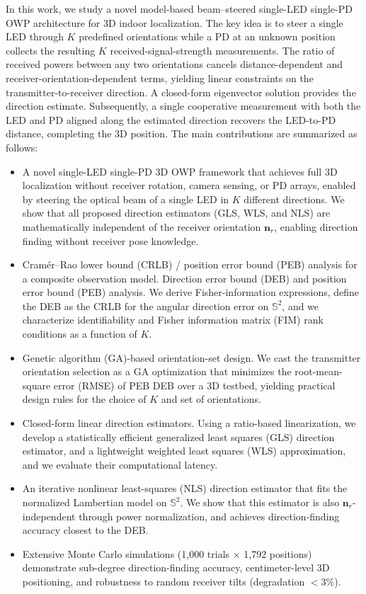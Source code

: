 \documentclass[journal]{IEEEtran}
\newcommand{\added}[1]{{\color{blue}#1}}
\newcommand{\deleted}[1]{{\color{red}#1}}
\begin{document}
In this work, we study a novel model-based beam–steered single-LED single-PD OWP architecture for 3D indoor localization. 
\added{The key idea is to steer a single LED through $K$ predefined orientations while a PD at an unknown position collects the resulting $K$ received-signal-strength measurements. The ratio of received powers between any two orientations cancels distance-dependent and receiver-orientation-dependent terms, yielding linear constraints on the transmitter-to-receiver direction. A closed-form eigenvector solution provides the direction estimate. Subsequently, a single cooperative measurement with both the LED and PD aligned along the estimated direction recovers the LED-to-PD distance, completing the 3D position.}
The main contributions are summarized as follows:
\begin{itemize}
    \item A novel single-LED single-PD 3D OWP framework that achieves full 3D localization without receiver rotation, camera sensing, or PD arrays, enabled by steering the optical beam of a single LED in $K$ different directions. \added{We show that all proposed direction estimators (GLS, WLS, and NLS) are mathematically independent of the receiver orientation $\mathbf{n}_r$, enabling direction finding without receiver pose knowledge.}
    \item \deleted{Cramér–Rao lower bound (CRLB) / position error bound (PEB) analysis for a composite observation model.} \added{Direction error bound (DEB) and position error bound (PEB) analysis.} We derive Fisher-information expressions, \added{define the DEB as the CRLB for the angular direction error on $\mathbb{S}^2$,} and we characterize identifiability and Fisher information matrix (FIM) rank conditions as a function of \(K\).
    \item Genetic algorithm (GA)-based orientation-set design. We cast the transmitter orientation selection as a GA optimization that minimizes the root-mean-square error (RMSE) of \deleted{PEB} \added{DEB} over a 3D testbed, yielding practical design rules for the choice of \(K\) and set of orientations.
    \item Closed-form linear direction estimators. Using a ratio-based linearization, we develop a statistically efficient generalized least squares (GLS) direction estimator, and a lightweight weighted least squares (WLS) approximation, and we evaluate their computational latency.
    \item \added{An iterative nonlinear least-squares (NLS) direction estimator that fits the normalized Lambertian model on $\mathbb{S}^2$. We show that this estimator is also $\mathbf{n}_r$-independent through power normalization, and achieves direction-finding accuracy closest to the DEB.}
    \item \added{Extensive Monte Carlo simulations (1,000 trials $\times$ 1,792 positions) demonstrate sub-degree direction-finding accuracy, centimeter-level 3D positioning, and robustness to random receiver tilts (degradation $<3\%$).}
\end{itemize}
\end{document}
